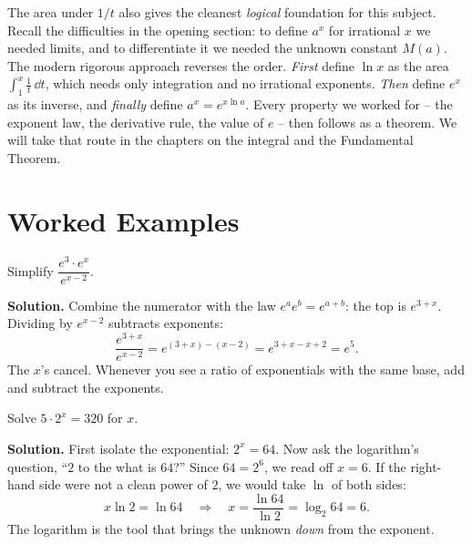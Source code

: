 \begin{connectionbox}
The area under $1/t$ also gives the cleanest \emph{logical} foundation for this subject. Recall the difficulties in the opening section: to define $a^x$ for irrational $x$ we needed limits, and to differentiate it we needed the unknown constant $M(a)$. The modern rigorous approach reverses the order. \emph{First} define $\ln x$ as the area $\int_1^x \frac{1}{t}\,\dd t$, which needs only integration and no irrational exponents. \emph{Then} define $e^x$ as its inverse, and \emph{finally} define $a^x = e^{x\ln a}$. Every property we worked for -- the exponent law, the derivative rule, the value of $e$ -- then follows as a theorem. We will take that route in the chapters on the integral and the Fundamental Theorem.
\end{connectionbox}

\section{Worked Examples}

\begin{example}\label{ch03:ex-law}
Simplify $\dfrac{e^{3}\cdot e^{x}}{e^{x-2}}$.

\textbf{Solution.} Combine the numerator with the law $e^a e^b = e^{a+b}$: the top is $e^{3+x}$. Dividing by $e^{x-2}$ subtracts exponents:
\[
\frac{e^{3+x}}{e^{x-2}} = e^{(3+x)-(x-2)} = e^{3+x-x+2} = e^{5}.
\]
The $x$'s cancel. Whenever you see a ratio of exponentials with the same base, add and subtract the exponents.
\end{example}

\begin{example}\label{ch03:ex-solve}
Solve $5\cdot 2^{x} = 320$ for $x$.

\textbf{Solution.} First isolate the exponential: $2^x = 64$. Now ask the logarithm's question, ``$2$ to the what is $64$?'' Since $64=2^6$, we read off $x=6$. If the right-hand side were not a clean power of $2$, we would take $\ln$ of both sides:
\[
x\ln 2 = \ln 64 \quad\Longrightarrow\quad x = \frac{\ln 64}{\ln 2} = \log_2 64 = 6 .
\]
The logarithm is the tool that brings the unknown \emph{down} from the exponent.
\end{example}

